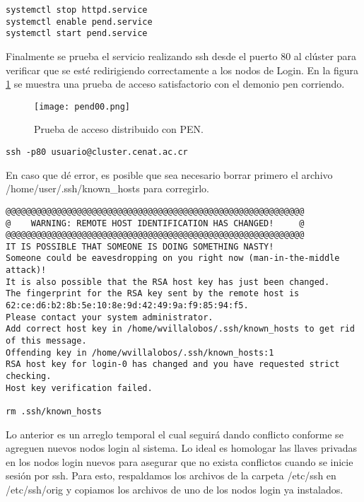 \begin{lstlisting} 
systemctl stop httpd.service
systemctl enable pend.service
systemctl start pend.service
\end{lstlisting}
Finalmente se prueba el servicio realizando ssh desde el puerto 80 al clúster para verificar que se esté redirigiendo correctamente a los nodos de Login. En la figura \ref{fig:pen:00} se muestra una prueba de acceso satisfactorio con el demonio pen corriendo.
\begin{figure}[H]
    \centering
    \texttt{[image: pend00.png]}
    \caption{Prueba de acceso distribuido con PEN.}
    \label{fig:pen:00}
\end{figure}
\begin{lstlisting} 
ssh -p80 usuario@cluster.cenat.ac.cr
\end{lstlisting}
En caso que dé error, es posible que sea necesario borrar primero el archivo /home/user/.ssh/known\_hosts para corregirlo.
\begin{lstlisting} 
@@@@@@@@@@@@@@@@@@@@@@@@@@@@@@@@@@@@@@@@@@@@@@@@@@@@@@@@@@@
@    WARNING: REMOTE HOST IDENTIFICATION HAS CHANGED!     @
@@@@@@@@@@@@@@@@@@@@@@@@@@@@@@@@@@@@@@@@@@@@@@@@@@@@@@@@@@@
IT IS POSSIBLE THAT SOMEONE IS DOING SOMETHING NASTY!
Someone could be eavesdropping on you right now (man-in-the-middle attack)!
It is also possible that the RSA host key has just been changed.
The fingerprint for the RSA key sent by the remote host is
62:ce:d6:b2:8b:5e:10:8e:9d:42:49:9a:f9:85:94:f5.
Please contact your system administrator.
Add correct host key in /home/wvillalobos/.ssh/known_hosts to get rid of this message.
Offending key in /home/wvillalobos/.ssh/known_hosts:1
RSA host key for login-0 has changed and you have requested strict checking.
Host key verification failed.

rm .ssh/known_hosts 
\end{lstlisting}

Lo anterior es un arreglo temporal el cual seguirá dando conflicto conforme se agreguen nuevos nodos login al sistema. Lo ideal es homologar las llaves privadas en los nodos login nuevos para asegurar que no exista conflictos cuando se inicie sesión por ssh. Para esto, respaldamos los archivos de la carpeta /etc/ssh en /etc/ssh/orig y copiamos los archivos de uno de los nodos login ya instalados.

